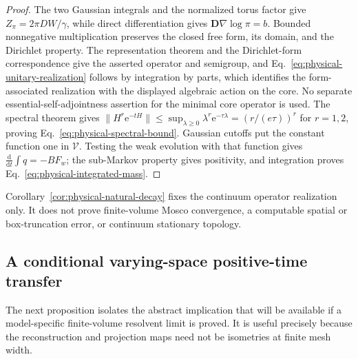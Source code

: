 \documentclass[aps,physrev,onecolumn,amsmath,amssymb,longbibliography]{revtex4-2}
\newcommand{\dd}{\mathrm d}
\newcommand{\e}{\mathrm e}
\begin{document}
\begin{proof}
The two Gaussian integrals and the normalized torus factor give
\(Z_\pi=2\pi DW/\gamma\), while direct differentiation gives
\(\bm D\nabla\log\pi=b\).  Bounded nonnegative multiplication preserves the
closed free form, its domain, and the Dirichlet property.  The representation
theorem and the Dirichlet-form correspondence give the asserted operator and
semigroup, and Eq.~\eqref{eq:physical-unitary-realization} follows by
integration by parts, which identifies the form-associated realization with
the displayed algebraic action on the core.  No separate
essential-self-adjointness assertion for the minimal core operator is used.
The
spectral theorem gives
\(\|H^r\e^{-tH}\|\le\sup_{\lambda\ge0}\lambda^r
\e^{-\tau\lambda}=(r/(e\tau))^r\) for \(r=1,2\), proving
Eq.~\eqref{eq:physical-spectral-bound}.  Gaussian cutoffs put the constant
function one in \(\mathcal V\).  Testing the weak evolution with that function
gives \(\frac{\dd}{\dd t}\int q=-B F_w\); the sub-Markov property gives
positivity, and integration proves Eq.~\eqref{eq:physical-integrated-mass}.
\end{proof}

Corollary~\ref{cor:physical-natural-decay} fixes the continuum operator
realization only.  It does not prove finite-volume Mosco convergence, a
computable spatial or box-truncation error, or continuum stationary topology.

\subsection{A conditional varying-space positive-time transfer}
\label{sec:varying-space-transfer}

The next proposition isolates the abstract implication that will be available
if a model-specific finite-volume resolvent limit is proved.  It is useful
precisely because the reconstruction and projection maps need not be
isometries at finite mesh width.
\end{document}
